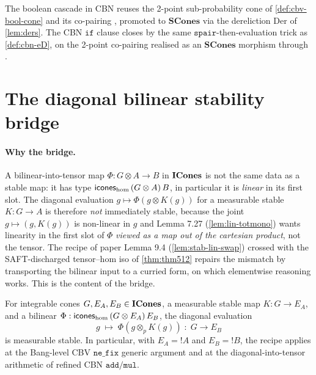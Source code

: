\begin{remark}\label{rem:cbn-bool}
\rocqok
{}\rocqok
The boolean cascade in CBN reuses the 2-point sub-probability cone
 of
\autoref{def:cbv-bool-cone} and its co-pairing
, promoted to
$\mathbf{SCones}$ via the dereliction $\mathrm{Der}$ of
\autoref{lem:ders}. The CBN $\mathtt{if}$ clause
 closes by the
same $\texttt{spair}$-then-evaluation trick as
\autoref{def:cbn-eD}, on the 2-point co-pairing realised as an
$\mathbf{SCones}$ morphism through
.
\end{remark}

\section{The diagonal bilinear stability bridge}\label{sec:diag-bilin}

\paragraph{Why the bridge.}
A bilinear-into-tensor map $\Phi : G \otimes A \to B$ in $\mathbf{ICones}$ is
not the same data as a stable map: it has type
$\mathsf{icones}_{\mathrm{hom}}\,(G \otimes A)\,B$, in particular it is
\emph{linear} in its first slot. The diagonal evaluation
$g \mapsto \Phi(g \otimes K(g))$ for a measurable stable
$K : G \to A$ is therefore \emph{not} immediately stable, because the
joint $g \mapsto (g, K(g))$ is non-linear in $g$ and Lemma 7.27
(\autoref{lem:lin-totmono}) wants linearity in the first slot of $\Phi$
\emph{viewed as a map out of the cartesian product}, not the tensor.
The recipe of paper Lemma 9.4 (\autoref{lem:stab-lin-swap}) crossed with
the SAFT-discharged tensor--hom iso of \autoref{thm:thm512} repairs the
mismatch by transporting the bilinear input to a curried form, on which
elementwise reasoning works. This is the content of the bridge.

\begin{theorem}\label{thm:diag-bilin}
\rocqok
{}
For integrable cones $G, E_A, E_B \in \mathbf{ICones}$, a measurable stable map
$K : G \to E_A$, and a bilinear $\Phi :
\mathsf{icones}_{\mathrm{hom}}\,(G \otimes E_A)\,E_B$, the diagonal evaluation
\[
  g \;\mapsto\; \Phi(g \otimes_p K(g))
  \;:\; G \to E_B
\]
is measurable stable. In particular, with $E_A = \mathord{!}A$ and
$E_B = \mathord{!}B$, the recipe applies at the Bang-level CBV
$\mathtt{ne\_fix}$ generic argument and at the
diagonal-into-tensor arithmetic of refined CBN $\mathtt{add}/\mathtt{mul}$.
\end{theorem}

